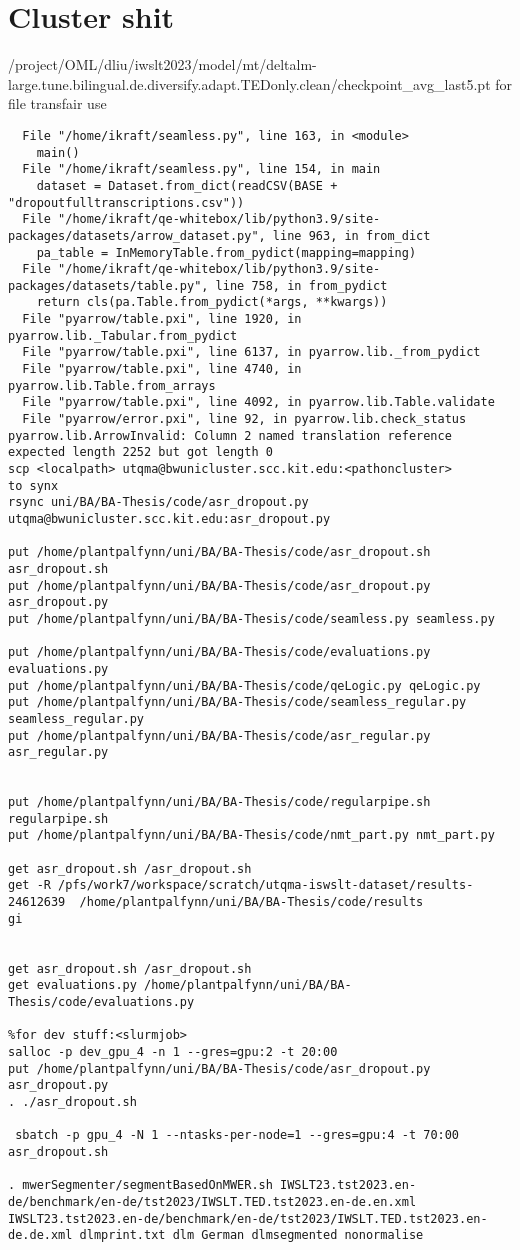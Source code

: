 \section{Cluster shit}
/project/OML/dliu/iwslt2023/model/mt/deltalm-large.tune.bilingual.de.diversify.adapt.TEDonly.clean/checkpoint_avg_last5.pt
for file transfair use
\begin{verbatim}
  File "/home/ikraft/seamless.py", line 163, in <module>
    main()
  File "/home/ikraft/seamless.py", line 154, in main
    dataset = Dataset.from_dict(readCSV(BASE + "dropoutfulltranscriptions.csv"))
  File "/home/ikraft/qe-whitebox/lib/python3.9/site-packages/datasets/arrow_dataset.py", line 963, in from_dict
    pa_table = InMemoryTable.from_pydict(mapping=mapping)
  File "/home/ikraft/qe-whitebox/lib/python3.9/site-packages/datasets/table.py", line 758, in from_pydict
    return cls(pa.Table.from_pydict(*args, **kwargs))
  File "pyarrow/table.pxi", line 1920, in pyarrow.lib._Tabular.from_pydict
  File "pyarrow/table.pxi", line 6137, in pyarrow.lib._from_pydict
  File "pyarrow/table.pxi", line 4740, in pyarrow.lib.Table.from_arrays
  File "pyarrow/table.pxi", line 4092, in pyarrow.lib.Table.validate
  File "pyarrow/error.pxi", line 92, in pyarrow.lib.check_status
pyarrow.lib.ArrowInvalid: Column 2 named translation reference expected length 2252 but got length 0
scp <localpath> utqma@bwunicluster.scc.kit.edu:<pathoncluster>
to synx
rsync uni/BA/BA-Thesis/code/asr_dropout.py utqma@bwunicluster.scc.kit.edu:asr_dropout.py

put /home/plantpalfynn/uni/BA/BA-Thesis/code/asr_dropout.sh asr_dropout.sh
put /home/plantpalfynn/uni/BA/BA-Thesis/code/asr_dropout.py asr_dropout.py
put /home/plantpalfynn/uni/BA/BA-Thesis/code/seamless.py seamless.py

put /home/plantpalfynn/uni/BA/BA-Thesis/code/evaluations.py evaluations.py
put /home/plantpalfynn/uni/BA/BA-Thesis/code/qeLogic.py qeLogic.py
put /home/plantpalfynn/uni/BA/BA-Thesis/code/seamless_regular.py seamless_regular.py
put /home/plantpalfynn/uni/BA/BA-Thesis/code/asr_regular.py asr_regular.py


put /home/plantpalfynn/uni/BA/BA-Thesis/code/regularpipe.sh regularpipe.sh
put /home/plantpalfynn/uni/BA/BA-Thesis/code/nmt_part.py nmt_part.py

get asr_dropout.sh /asr_dropout.sh
get -R /pfs/work7/workspace/scratch/utqma-iswslt-dataset/results-24612639  /home/plantpalfynn/uni/BA/BA-Thesis/code/results
gi


get asr_dropout.sh /asr_dropout.sh
get evaluations.py /home/plantpalfynn/uni/BA/BA-Thesis/code/evaluations.py
 
%for dev stuff:<slurmjob>
salloc -p dev_gpu_4 -n 1 --gres=gpu:2 -t 20:00
put /home/plantpalfynn/uni/BA/BA-Thesis/code/asr_dropout.py asr_dropout.py
. ./asr_dropout.sh

 sbatch -p gpu_4 -N 1 --ntasks-per-node=1 --gres=gpu:4 -t 70:00 asr_dropout.sh
 
. mwerSegmenter/segmentBasedOnMWER.sh IWSLT23.tst2023.en-de/benchmark/en-de/tst2023/IWSLT.TED.tst2023.en-de.en.xml IWSLT23.tst2023.en-de/benchmark/en-de/tst2023/IWSLT.TED.tst2023.en-de.de.xml dlmprint.txt dlm German dlmsegmented nonormalise
\end{verbatim}

